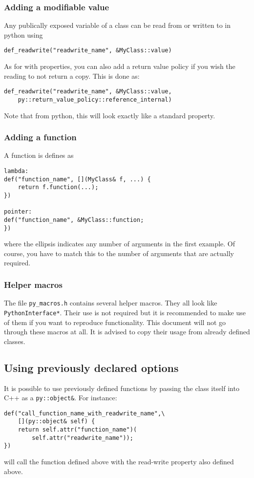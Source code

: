 \subsubsection{Adding a modifiable value}
Any publically exposed variable of a class can be read from or written to in python using

\begin{verbatim}
def_readwrite("readwrite_name", &MyClass::value)
\end{verbatim}
As for with properties, you can also add a return value policy if you wish the reading
to not return a copy.  This is done as:
\begin{verbatim}
def_readwrite("readwrite_name", &MyClass::value,
    py::return_value_policy::reference_internal)
\end{verbatim}
Note that from python, this will look exactly like a standard property.

\subsubsection{Adding a function}
A function is defines as
\begin{verbatim}
lambda:
def("function_name", [](MyClass& f, ...) {
    return f.function(...);
})

pointer:
def("function_name", &MyClass::function;
})
\end{verbatim}
where the ellipsis indicates any number of arguments in the first example.  Of course,
you have to match this to the number of arguments that are actually required.

\subsubsection{Helper macros}
The file \verb|py_macros.h| contains several helper macros.  They all look like \verb|PythonInterface*|.
Their use is not required but it is recommended to make use of them if you want to reproduce functionality.  This document will not go
through these macros at all.  It is advised to copy their usage from already defined classes.

\subsection{Using previously declared options}
It is possible to use previously defined functions by passing the class itself into C++ as a \verb|py::object&|.
For instance:
\begin{verbatim}
def("call_function_name_with_readwrite_name",\
    [](py::object& self) {
    return self.attr("function_name")(
        self.attr("readwrite_name"));
})
\end{verbatim}
will call the function defined above with the read-write property also defined above.


